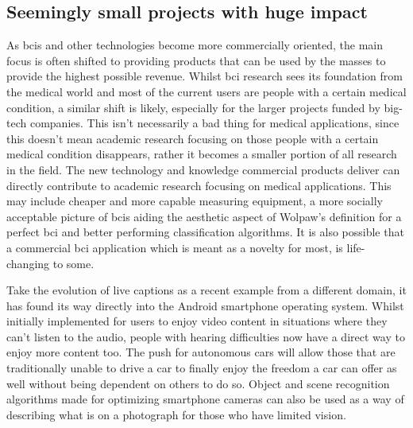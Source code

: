
\subsection{Seemingly small projects with huge impact}
\label{subsec:bci_opportunities_obstacles_small_projects}

As \glspl{bci} and other technologies become more commercially oriented, the main focus is often shifted to providing products that can be used by the masses to provide the highest possible revenue.
Whilst \gls{bci} research sees its foundation from the medical world and most of the current users are people with a certain medical condition, a similar shift is likely, especially for the larger projects funded by big-tech companies.
This isn't necessarily a bad thing for medical applications, since this doesn't mean academic research focusing on those people with a certain medical condition disappears, rather it becomes a smaller portion of all research in the field.
The new technology and knowledge commercial products deliver can directly contribute to academic research focusing on medical applications.
This may include cheaper and more capable measuring equipment, a more socially acceptable picture of \glspl{bci} aiding the aesthetic aspect of Wolpaw's definition for a perfect \gls{bci} and better performing classification algorithms.
It is also possible that a commercial \gls{bci} application which is meant as a novelty for most, is life-changing to some.

Take the evolution of live captions as a recent example from a different domain, it has found its way directly into the Android smartphone operating system.
Whilst initially implemented for users to enjoy video content in situations where they can't listen to the audio, people with hearing difficulties now have a direct way to enjoy more content too.
The push for autonomous cars will allow those that are traditionally unable to drive a car to finally enjoy the freedom a car can offer as well without being dependent on others to do so.
Object and scene recognition algorithms made for optimizing smartphone cameras can also be used as a way of describing what is on a photograph for those who have limited vision.

